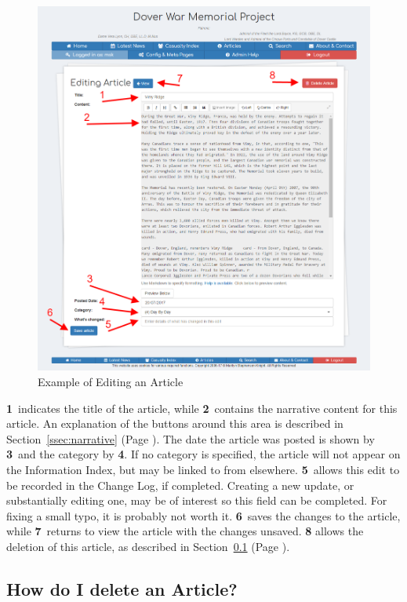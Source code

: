 \documentclass[12pt]{article}
\newcommand{\marker}[1]{\color{red}\textbf{#1}\color{black}}
\newcommand{\myref}[1]{\ref{#1} {\scriptsize(Page \pageref{#1})}}
\begin{document}
\begin{figure}[h]
  \centering
 \includegraphics[width=.9\textwidth]{pics/edit_article.png}
	\caption{Example of Editing an Article}\label{fig:edit_article}
\end{figure}

\marker{1}\ indicates the title of the article, while \marker{2}\ contains the narrative content for this article. An explanation of the buttons around this area is described in Section~\myref{ssec:narrative}. The date the article was posted is shown by \marker{3}\ and the category by \marker{4}. If no category is specified, the article will not appear on the Information Index, but may be linked to from elsewhere. \marker{5}\ allows this edit to be recorded in the Change Log, if completed. Creating a new update, or substantially editing one, may be of interest so this field can be completed. For fixing a small typo, it is probably not worth it. \marker{6}\ saves the changes to the article, while \marker{7}\ returns to view the article with the changes unsaved. \marker{8} allows the deletion of this article, as described in Section~\myref{ssec:delete_article}.

\FloatBarrier
\subsection{How do I delete an Article?}\label{ssec:delete_article}
\end{document}
